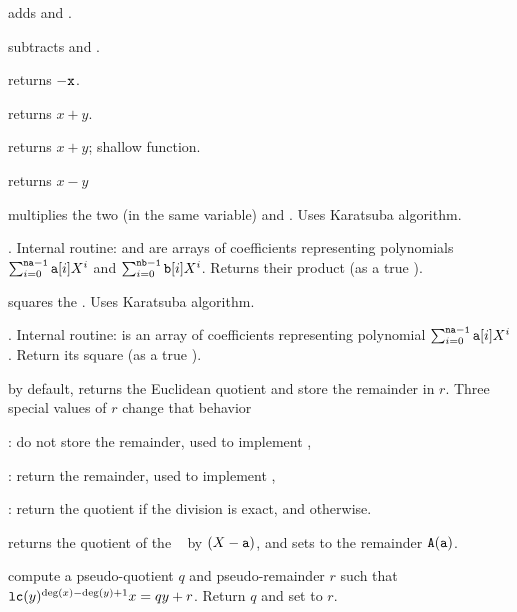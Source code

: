  adds  and .

 subtracts  and .

 returns $-{\tt x}$.

 returns $x+y$.

 returns $x+y$; shallow function.


 returns $x-y$

 multiplies the two  (in the same
variable)  and . Uses Karatsuba algorithm.

. Internal routine:
 and  are arrays of coefficients representing polynomials
$\sum_{i = 0}^{{\tt na-1}} {\tt a}[i] X^i$ and
$\sum_{i = 0}^{{\tt nb-1}} {\tt b}[i] X^i$. Returns their product (as a true
).

 squares the  . Uses Karatsuba
algorithm.

. Internal routine:
 is an array of coefficients representing polynomial
$\sum_{i = 0}^{{\tt na-1}} {\tt a}[i] X^i$. Return its square (as a true
).

 by default, returns the Euclidean
quotient and store the remainder in $r$. Three special values of $r$ change
that behavior
\item {}: do not store the remainder, used to implement ,

\item {}: return the remainder, used to implement ,

\item {}: return the quotient if the division is exact, and
 otherwise.


 returns the
quotient of the ~ by $(X - {\tt a})$, and sets  to the
remainder ${\tt A}({\tt a})$.


 compute a pseudo-quotient
$q$ and pseudo-remainder $r$ such that ${\tt lc}(y)^{\deg(x) - \deg(y) + 1}x
= qy + r$. Return $q$ and set  to $r$.

